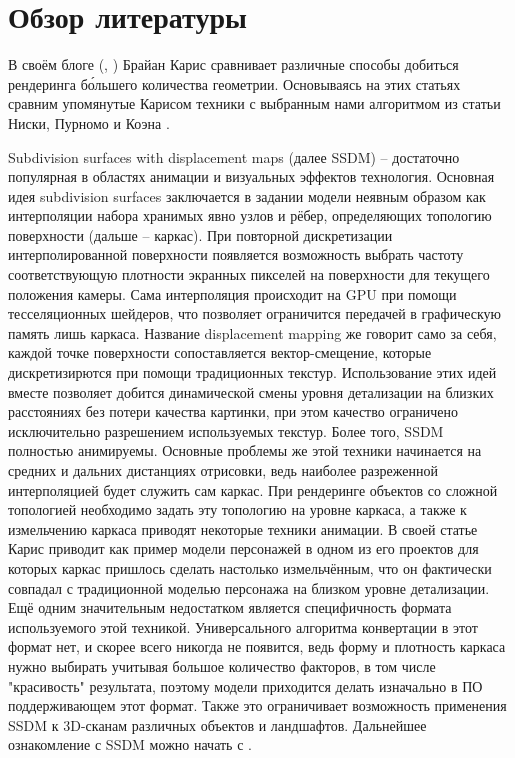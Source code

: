 \documentclass{article}
\begin{document}
\section{Обзор литературы}
\label{sec:related}
В своём блоге (\cite{graphicrants_moregeometry}, \cite{graphicrants_vgi}) Брайан Карис сравнивает различные способы добиться рендеринга б\'ольшего количества геометрии. Основываясь на этих статьях сравним упомянутые Карисом техники с выбранным нами алгоритмом из статьи Ниски, Пурномо и Коэна \cite{niski2007multi}.

Subdivision surfaces with displacement maps (далее SSDM) -- достаточно популярная в областях анимации и визуальных эффектов технология. Основная идея subdivision surfaces заключается в задании модели неявным образом как интерполяции набора хранимых явно узлов и рёбер, определяющих топологию поверхности (дальше -- каркас). При повторной дискретизации интерполированной поверхности появляется возможность выбрать частоту соответствующую плотности экранных пикселей на поверхности для текущего положения камеры. Сама интерполяция происходит на GPU при помощи тесселяционных шейдеров, что позволяет ограничится передачей в графическую память лишь каркаса. Название displacement mapping же говорит само за себя, каждой точке поверхности сопоставляется вектор-смещение, которые дискретизирются при помощи традиционных текстур. Использование этих идей вместе позволяет добится динамической смены уровня детализации на близких расстояниях без потери качества картинки, при этом качество ограничено исключительно разрешением используемых текстур. Более того, SSDM полностью анимируемы. Основные проблемы же этой техники начинается на средних и дальних дистанциях отрисовки, ведь наиболее разреженной интерполяцией будет служить сам каркас. При рендеринге объектов со сложной топологией необходимо задать эту топологию на уровне каркаса, а также к измельчению каркаса приводят некоторые техники анимации. В своей статье Карис приводит как пример модели персонажей в одном из его проектов для которых каркас пришлось сделать настолько измельчённым, что он фактически совпадал с традиционной моделью персонажа на близком уровне детализации. Ещё одним значительным недостатком является специфичность формата используемого этой техникой. Универсального алгоритма конвертации в этот формат нет, и скорее всего никогда не появится, ведь форму и плотность каркаса нужно выбирать учитывая большое количество факторов, в том числе "красивость" результата, поэтому модели приходится делать изначально в ПО поддерживающем этот формат. Также это ограничивает возможность применения SSDM к 3D-сканам различных объектов и ландшафтов. Дальнейшее ознакомление с SSDM можно начать с \cite{ref}.
\end{document}
